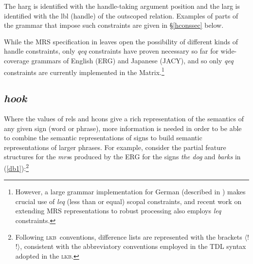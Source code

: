 \documentclass[12pt]{article}
\newcommand{\lkb}{\textsc{lkb}}
\newcommand{\fn}{\footnote}
\begin{document}
\noindent
The {\sc harg} is identified with the handle-taking argument position
and the {\sc larg} is identified with the {\sc lbl} (handle) of the outscoped
relation.  Examples of parts of the grammar that impose such constraints
are given in \S\ref{hconssec} below.

While the MRS specification in  leaves
open the possibility of different kinds of handle constraints, only
{\it qeq} constraints have proven necessary so far for wide-coverage
grammars of English (ERG) and Japanese (JACY), and so only
{\it qeq} constraints are currently implemented in the 
Matrix.\footnote{However, a large grammar implementation for German 
(described in )
makes crucial use of {\it leq} (less than or equal) scopal
constraints, and recent work on extending MRS representations to robust 
processing \cite{Cop:03} also employs {\it leq} constraints.}

\subsection{{\it hook}}
\label{hooksec}

Where the values of {\sc rels} and {\sc hcons} give a rich representation of 
the semantics of any given sign (word or phrase),
more information is needed in order to be able to combine the semantic
representations of signs to build
semantic representations of larger phrases.  For example, consider the
partial feature structures for the {\it mrs}s produced by the ERG for the 
signs {\it the dog} and {\it barks} in
(\ref{db1}):\fn{Following \lkb\ conventions, difference lists are
represented with the brackets $\langle$! !$\rangle$, consistent with the
abbreviatory conventions employed in the TDL \cite{Kri:Sch:94}
syntax adopted in the \lkb.}
\end{document}
